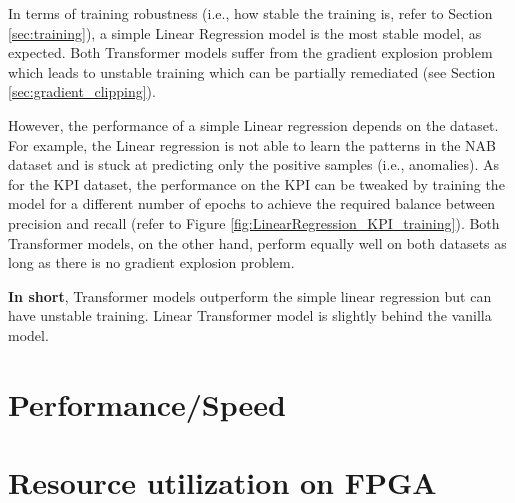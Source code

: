 \documentclass[a4paper, twoside]{report}
\theoremstyle{definition}
\numberwithin{equation}{section}
\begin{document}
In terms of training robustness (i.e., how stable the training is, refer to Section \ref{sec:training}),
a simple Linear Regression model is the most stable model, as expected. Both Transformer models suffer
from the gradient explosion problem which leads to unstable training
which can be partially remediated (see Section \ref{sec:gradient_clipping}).

However, the performance of a simple Linear regression depends on the dataset. For example,
the Linear regression is not able to learn the patterns in the NAB dataset
and is stuck at predicting only the positive samples (i.e., anomalies).
As for the KPI dataset, the performance on the KPI can be tweaked by training
the model for a different number of epochs to achieve the required balance between
precision and recall (refer to Figure \ref{fig:LinearRegression_KPI_training}).
Both Transformer models, on the other hand, perform equally well on both datasets
as long as there is no gradient explosion problem.

\textbf{In short}, Transformer models outperform the simple linear regression
but can have unstable training. Linear Transformer model is slightly behind
the vanilla model.


\section{Performance/Speed} \label{sec:performance}





\section{Resource utilization on FPGA}


\end{document}
